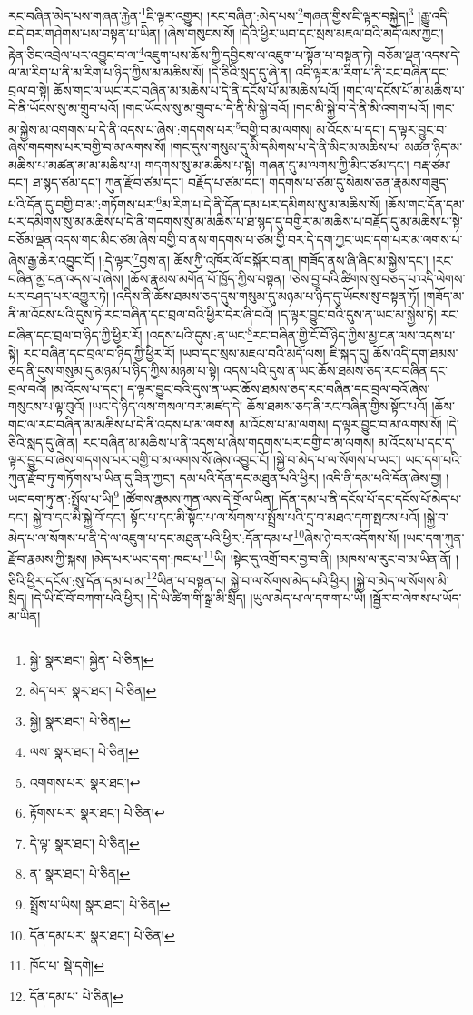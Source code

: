 རང་བཞིན་མེད་པས་གཞན་རྐྱེན་\footnote{སྐྱེ་  སྣར་ཐང་། སྐྱེན་  པེ་ཅིན། }ཇི་ལྟར་འགྱུར། །རང་བཞིན་:མེད་པས་\footnote{མེད་པར་  སྣར་ཐང་།  པེ་ཅིན། }གཞན་གྱིས་ཇི་ལྟར་བསྐྱེད།\footnote{སྐྱེ།  སྣར་ཐང་།  པེ་ཅིན། } །རྒྱུ་འདི་བདེ་བར་གཤེགས་པས་བསྟན་པ་ཡིན། །ཞེས་གསུངས་སོ། །དེའི་ཕྱིར་ཡབ་དང་སྲས་མཇལ་བའི་མདོ་ལས་ཀྱང་། རྟེན་ཅིང་འབྲེལ་པར་འབྱུང་བ་ལ་\footnote{ལས་  སྣར་ཐང་།  པེ་ཅིན། }འཇུག་པས་ཆོས་ཀྱི་དབྱིངས་ལ་འཇུག་པ་སྟོན་པ་བསྟན་ཏེ། བཅོམ་ལྡན་འདས་དེ་ལ་མ་རིག་པ་ནི་མ་རིག་པ་ཉིད་ཀྱིས་མ་མཆིས་སོ། །དེ་ཅིའི་སླད་དུ་ཞེ་ན། འདི་ལྟར་མ་རིག་པ་ནི་རང་བཞིན་དང་བྲལ་བ་སྟེ། ཆོས་གང་ལ་ཡང་རང་བཞིན་མ་མཆིས་པ་དེ་ནི་དངོས་པོ་མ་མཆིས་པའོ། །གང་ལ་དངོས་པོ་མ་མཆིས་པ་དེ་ནི་ཡོངས་སུ་མ་གྲུབ་པའོ། །གང་ཡོངས་སུ་མ་གྲུབ་པ་དེ་ནི་མི་སྐྱེ་བའོ། །གང་མི་སྐྱེ་བ་དེ་ནི་མི་འགག་པའོ། །གང་མ་སྐྱེས་མ་འགགས་པ་དེ་ནི་འདས་པ་ཞེས་:གདགས་པར་\footnote{འགགས་པར་  སྣར་ཐང་། }བགྱི་བ་མ་ལགས། མ་འོངས་པ་དང་། ད་ལྟར་བྱུང་བ་ཞེས་གདགས་པར་བགྱི་བ་མ་ལགས་སོ། །གང་དུས་གསུམ་དུ་མི་དམིགས་པ་དེ་ནི་མིང་མ་མཆིས་པ། མཚན་ཉིད་མ་མཆིས་པ་མཚན་མ་མ་མཆིས་པ། གདགས་སུ་མ་མཆིས་པ་སྟེ། གཞན་དུ་མ་ལགས་ཀྱི་མིང་ཙམ་དང་། བརྡ་ཙམ་དང་། ཐ་སྙད་ཙམ་དང་། ཀུན་རྫོབ་ཙམ་དང་། བརྗོད་པ་ཙམ་དང་། གདགས་པ་ཙམ་དུ་སེམས་ཅན་རྣམས་གཟུད་པའི་དོན་དུ་བགྱི་བ་མ་:གཏོགས་པར་\footnote{རྟོགས་པར་  སྣར་ཐང་།  པེ་ཅིན། }མ་རིག་པ་དེ་ནི་དོན་དམ་པར་དམིགས་སུ་མ་མཆིས་སོ། །ཆོས་གང་དོན་དམ་པར་དམིགས་སུ་མ་མཆིས་པ་དེ་ནི་གདགས་སུ་མ་མཆིས་པ་ཐ་སྙད་དུ་བགྱིར་མ་མཆིས་པ་བརྗོད་དུ་མ་མཆིས་པ་སྟེ་བཅོམ་ལྡན་འདས་གང་མིང་ཙམ་ཞེས་བགྱི་བ་ནས་གདགས་པ་ཙམ་གྱི་བར་དེ་དག་ཀྱང་ཡང་དག་པར་མ་ལགས་པ་ཞེས་རྒྱ་ཆེར་འབྱུང་ངོ། །:དེ་ལྟར་\footnote{དེ་ལྟ་  སྣར་ཐང་།  པེ་ཅིན། }བྱས་ན། ཆོས་ཀྱི་འཁོར་ལོ་བསྐོར་བ་ན། །གཟོད་ནས་ཞི་ཞིང་མ་སྐྱེས་དང་། །རང་བཞིན་མྱ་ངན་འདས་པ་ཞེས། །ཆོས་རྣམས་མགོན་པོ་ཁྱོད་ཀྱིས་བསྟན། །ཅེས་བྱ་བའི་ཚིགས་སུ་བཅད་པ་འདི་ལེགས་པར་བཤད་པར་འགྱུར་ཏེ། །འདིས་ནི་ཆོས་ཐམས་ཅད་དུས་གསུམ་དུ་མཉམ་པ་ཉིད་དུ་ཡོངས་སུ་བསྟན་ཏོ། །གཟོད་མ་ནི་མ་འོངས་པའི་དུས་ཏེ་རང་བཞིན་དང་བྲལ་བའི་ཕྱིར་དེར་ཞི་བའོ། །ད་ལྟར་བྱུང་བའི་དུས་ན་ཡང་མ་སྐྱེས་ཏེ། རང་བཞིན་དང་བྲལ་བ་ཉིད་ཀྱི་ཕྱིར་རོ། །འདས་པའི་དུས་:ན་ཡང་\footnote{ན་  སྣར་ཐང་།  པེ་ཅིན། }རང་བཞིན་གྱི་ངོ་བོ་ཉིད་ཀྱིས་མྱ་ངན་ལས་འདས་པ་སྟེ། རང་བཞིན་དང་བྲལ་བ་ཉིད་ཀྱི་ཕྱིར་རོ། །ཡབ་དང་སྲས་མཇལ་བའི་མདོ་ལས། ཇི་སྐད་དུ། ཆོས་འདི་དག་ཐམས་ཅད་ནི་དུས་གསུམ་དུ་མཉམ་པ་ཉིད་ཀྱིས་མཉམ་པ་སྟེ། འདས་པའི་དུས་ན་ཡང་ཆོས་ཐམས་ཅད་རང་བཞིན་དང་བྲལ་བའོ། །མ་འོངས་པ་དང་། ད་ལྟར་བྱུང་བའི་དུས་ན་ཡང་ཆོས་ཐམས་ཅད་རང་བཞིན་དང་བྲལ་བའོ་ཞེས་གསུངས་པ་ལྟ་བུའོ། །ཡང་དེ་ཉིད་ལས་གསལ་བར་མཛད་དེ། ཆོས་ཐམས་ཅད་ནི་རང་བཞིན་གྱིས་སྟོང་པའོ། །ཆོས་གང་ལ་རང་བཞིན་མ་མཆིས་པ་དེ་ནི་འདས་པ་མ་ལགས། མ་འོངས་པ་མ་ལགས། ད་ལྟར་བྱུང་བ་མ་ལགས་སོ། །དེ་ཅིའི་སླད་དུ་ཞེ་ན། རང་བཞིན་མ་མཆིས་པ་ནི་འདས་པ་ཞེས་གདགས་པར་བགྱི་བ་མ་ལགས། མ་འོངས་པ་དང་ད་ལྟར་བྱུང་བ་ཞེས་གདགས་པར་བགྱི་བ་མ་ལགས་སོ་ཞེས་འབྱུང་ངོ། །སྐྱེ་བ་མེད་པ་ལ་སོགས་པ་ཡང་། ཡང་དག་པའི་ཀུན་རྫོབ་ཏུ་གཏོགས་པ་ཡིན་དུ་ཟིན་ཀྱང་། དམ་པའི་དོན་དང་མཐུན་པའི་ཕྱིར། །འདི་ནི་དམ་པའི་དོན་ཞེས་བྱ། །ཡང་དག་ཏུ་ན་:སྤྲོས་པ་ཡི།\footnote{སྤྲོས་པ་ཡིས།  སྣར་ཐང་།  པེ་ཅིན། } །ཚོགས་རྣམས་ཀུན་ལས་དེ་གྲོལ་ཡིན། །དོན་དམ་པ་ནི་དངོས་པོ་དང་དངོས་པོ་མེད་པ་དང་། སྐྱེ་བ་དང་མི་སྐྱེ་བོ་དང་། སྟོང་པ་དང་མི་སྟོང་པ་ལ་སོགས་པ་སྤྲོས་པའི་དྲ་བ་མཐའ་དག་སྤངས་པའོ། །སྐྱེ་བ་མེད་པ་ལ་སོགས་པ་ནི་དེ་ལ་འཇུག་པ་དང་མཐུན་པའི་ཕྱིར་:དོན་དམ་པ་\footnote{དོན་དམ་པར་  སྣར་ཐང་།  པེ་ཅིན། }ཞེས་ཉེ་བར་འདོགས་སོ། །ཡང་དག་ཀུན་རྫོབ་རྣམས་ཀྱི་སྐས། །མེད་པར་ཡང་དག་:ཁང་པ་\footnote{ཁོང་པ་  སྡེ་དགེ། }ཡི། །སྟེང་དུ་འགྲོ་བར་བྱ་བ་ནི། །མཁས་ལ་རུང་བ་མ་ཡིན་ནོ། །ཅིའི་ཕྱིར་དངོས་:སུ་དོན་དམ་པ་མ་\footnote{དོན་དམ་པ་  པེ་ཅིན། }ཡིན་པ་བསྟན་པ། སྐྱེ་བ་ལ་སོགས་མེད་པའི་ཕྱིར། །སྐྱེ་བ་མེད་ལ་སོགས་མི་སྲིད། །དེ་ཡི་ངོ་བོ་བཀག་པའི་ཕྱིར། །དེ་ཡི་ཚིག་གི་སྒྲ་མི་སྲིད། །ཡུལ་མེད་པ་ལ་དགག་པ་ཡི། །སྦྱོར་བ་ལེགས་པ་ཡོད་མ་ཡིན། 